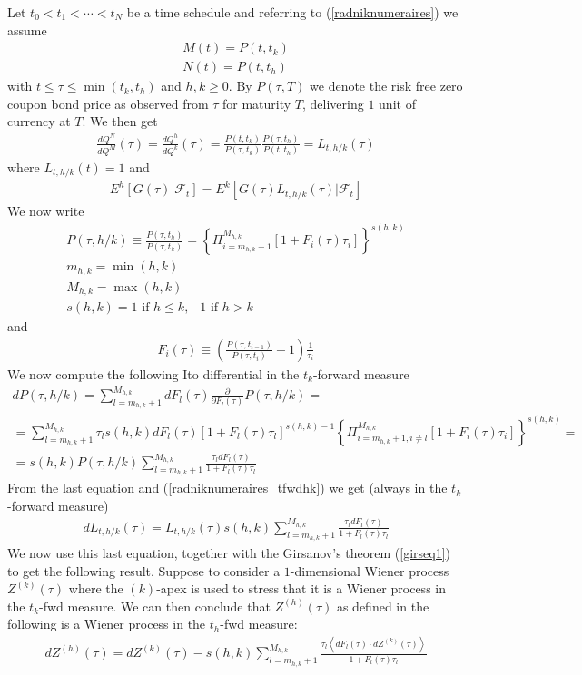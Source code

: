 \documentclass[a4paper,10pt]{report}
\theoremstyle{plain}
\theoremstyle{definition}
\newcommand\be{\begin{eqnarray}}    %
\newcommand\ee{\end{eqnarray}}
\newcommand{\FF} {\mathcal{F} }
\begin{document}
Let $t_0<t_1<\cdots < t_{N}$ be a time schedule and referring to (\ref{radniknumeraires}) we assume
\be 
M(t) = P(t, t_k) \\
N(t) = P(t, t_h)
\ee
with $t\le \tau \le \min(t_k, t_h)$ and $h,k\ge 0$. By $P(\tau, T)$ we denote the risk free zero coupon bond price as observed from $\tau$ for maturity $T$, delivering $1$ unit of currency at $T$. We then get
\be 
\frac{dQ^N}{dQ^M}(\tau) =  \frac{dQ^h}{dQ^k}(\tau) =  \frac{P(t, t_k)}{P(\tau, t_k)} \frac{P(\tau, t_h)}{P(t, t_h)}=L_{t, h/k}(\tau)
\label{radniknumeraires_tfwdhk}
\ee
where $L_{t, h/k}(t)=1$ and 
\be 
E^h\left[G(\tau)| \FF_t \right] = E^k\left[G(\tau) L_{t, h/k}(\tau) | \FF_t \right]
\ee
We now write
\be 
P(\tau, h/k) \equiv \frac{P(\tau, t_h)}{P(\tau, t_k)}= \left\{\Pi_{i=m_{h,k}+1}^{M_{h,k}}\left[ 1 + F_i(\tau)\tau_i \right]\right\}^{s(h,k)} \label{phk}\\
m_{h,k} = \min(h, k)\\
M_{h,k} = \max(h, k) \\
s(h,k) = 1 \mbox{ if $h\le k$}, -1 \mbox{ if $h> k$}
\ee
and 
\be
F_i(\tau)\equiv \left(\frac{P(\tau, t_{i-1})}{P(\tau, t_i)}-1\right)\frac{1}{\tau_i}
\ee
We now compute the following Ito differential in the $t_k$-forward measure
\be 
d P(\tau, h/k) = \sum_{l=m_{h,k}+1}^{M_{h,k}} d F_l(\tau) \frac{\partial}{\partial F_l(\tau)}  P(\tau, h/k) =\\
=\sum_{l=m_{h,k}+1}^{M_{h,k}}\tau_l  s(h,k)  d F_l(\tau)\left[ 1 + F_l(\tau)\tau_l \right]^{s(h,k)-1}  \left\{\Pi_{i=m_{h,k}+1, i\neq l}^{M_{h,k}}\left[ 1 + F_i(\tau)\tau_i \right]\right\}^{s(h,k)}= \\
= s(h,k) P(\tau, h/k) \sum_{l=m_{h,k}+1}^{M_{h,k}} \frac{\tau_l  d F_l(\tau)}{1 + F_l(\tau)\tau_l } 
\label{dphk}
\ee
From the last equation and (\ref{radniknumeraires_tfwdhk}) we get (always in the $t_k$-forward measure)
\be 
d L_{t, h/k}(\tau) = L_{t, h/k}(\tau)  s(h,k) \sum_{l=m_{h,k}+1}^{M_{h,k}} \frac{\tau_l  d F_l(\tau)}{1 + F_l(\tau)\tau_l } 
\ee
We now use this last equation, together with the Girsanov's theorem (\ref{girseq1}) to get the following result.
Suppose to consider a $1$-dimensional Wiener process $Z^{(k)}(\tau)$ where the $(k)$-apex is used to stress that it is a Wiener process in the $t_k$-fwd measure. We can then conclude that $Z^{(h)}(\tau)$ as defined in the following is a Wiener process in the $t_h$-fwd measure:
\be 
dZ^{(h)}(\tau) = dZ^{(k)}(\tau)- s(h,k) \sum_{l=m_{h,k}+1}^{M_{h,k}} \frac{\tau_l  \left<d F_l(\tau)\cdot dZ^{(k)}(\tau)\right>}{1 + F_l(\tau)\tau_l } 
\label{tfwdmeasurechangedet}
\ee
\end{document}
